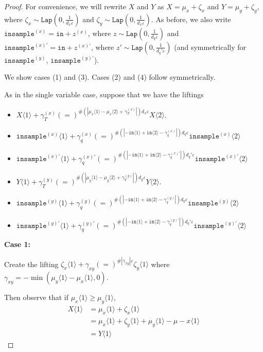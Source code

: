 \documentclass[12pt]{article}
\newcommand{\brangle}[1]{\langle #1 \rangle}
\newcommand{\Lap}{\texttt{Lap}}
\theoremstyle{definition}
\begin{document}
\begin{proof}
    For convenience, we will rewrite $X$ and $Y$ as $X = \mu_x + \zeta_x$ and $Y = \mu_y + \zeta_y$, where $\zeta_x \sim\Lap(0, \frac{1}{d_x\varepsilon})$ and $\zeta_y \sim\Lap(0, \frac{1}{d_x\varepsilon})$. 
    As before, we also write $\texttt{insample}^{(x)} = \texttt{in} + z^{(x)}$, where $z\sim\Lap(0, \frac{1}{d_q\varepsilon})$ and $\texttt{insample}^{(x)\prime} = \texttt{in} + z^{(x)\prime}$, where $z'\sim\Lap(0, \frac{1}{d_q'\varepsilon})$ (and symmetrically for $\texttt{insample}^{(y)}$, $\texttt{insample}^{(y)\prime}$).

    We show cases (1) and (3). Cases (2) and (4) follow symmetrically. 

    As in the single variable case, suppose that we have the liftings
    \begin{itemize}
        \item $X\brangle{1}+\gamma_T^{(x)} (=)^{\#(|\mu_x\brangle{1}-\mu_x\brangle{2}+\gamma_T^{(x)}|)d_x\varepsilon}X\brangle{2}$.
        \item $\texttt{insample}^{(x)}\brangle{1} +\gamma_q^{(x)}{(=)}^{\#(|-\texttt{in}\brangle{1}+\texttt{in}\brangle{2}-\gamma_q^{(x)}|)d_q\varepsilon}\texttt{insample}^{(x)}\brangle{2}$
        \item $\texttt{insample}^{(x)\prime}\brangle{1} +\gamma_q^{(x)\prime}{(=)}^{\#(|-\texttt{in}\brangle{1}+\texttt{in}\brangle{2}-\gamma_q^{(x)\prime}|)d_q'\varepsilon}\texttt{insample}^{(x)\prime}\brangle{2}$
        \item $Y\brangle{1}+\gamma_T^{(y)} (=)^{\#(|\mu_y\brangle{1}-\mu_y\brangle{2}+\gamma_T^{(y)}|)d_y\varepsilon}Y\brangle{2}$.
        \item $\texttt{insample}^{(y)}\brangle{1} +\gamma_q^{(y)}{(=)}^{\#(|-\texttt{in}\brangle{1}+\texttt{in}\brangle{2}-\gamma_q^{(y)}|)d_q\varepsilon}\texttt{insample}^{(y)}\brangle{2}$
        \item $\texttt{insample}^{(y)\prime}\brangle{1} +\gamma_q^{(y)\prime}{(=)}^{\#(|-\texttt{in}\brangle{1}+\texttt{in}\brangle{2}-\gamma_q^{(y)\prime}|)d_q'\varepsilon}\texttt{insample}^{(y)\prime}\brangle{2}$
    \end{itemize}

    \textbf{Case 1:}

    Create the lifting $\zeta_x\brangle{1} +\gamma_{xy}(=)^{\#|\gamma_{xy}|\varepsilon}\zeta_y\brangle{1}$ where $\gamma_{xy} = -\min(\mu_y\brangle{1}-\mu_x\brangle{1}, 0)$.

    Then observe that if $\mu_x\brangle{1}\geq \mu_y\brangle{1}$, \begin{align*}
        X\brangle{1}&= \mu_x\brangle{1} + \zeta_x\brangle{1}\\
        &= \mu_x\brangle{1} + \zeta_y\brangle{1}+\mu_y\brangle{1}-\mu-x\brangle{1}\\
        &=Y\brangle{1}
    \end{align*}


\end{proof}
\end{document}
